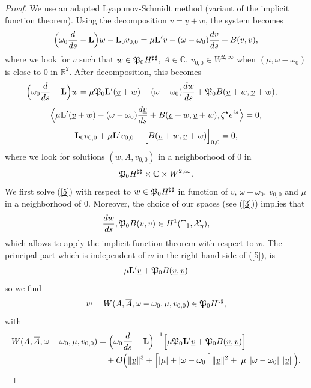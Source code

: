 \documentclass[11pt]{article}
\begin{document}
\begin{proof}
We use an adapted Lyapunov-Schmidt method (variant of the implicit function theorem).
Using the decomposition $v = \underline{v} + w$, the system becomes 
$$
\Bigl( \omega_0 {d \over ds} - {\bf L} \Bigr) w - {\bf L}_{0} v_{0,0}
= \mu {\bf L}' v - (\omega - \omega_0) {dv \over ds} + B(v,v),
$$
where we look for $v$ such that $w \in \frak{P}_0 H^{\sharp\sharp}$, $A \in \mathbb{C}$,
$v_{0,0} \in W^{2,\infty}$
when $(\mu, \omega - \omega_0)$ is close to $0$
in $\mathbb{R}^2$. After decomposition, this becomes
\begin{align} \label{5}
\Bigl( \omega_0 {d \over ds} - {\bf L} \Bigr) w
&= \mu \frak{P}_0 {\bf L}'(\underline{v} + w) 
- (\omega - \omega_0) {d w \over ds} 
+ \frak{P}_0 B(\underline{v} + w, \underline{v} + w),
\end{align}
\begin{equation} \label{6}
\Big\langle \mu {\bf L}'(\underline{v} + w) - (\omega - \omega_0)
{d \underline{v} \over ds} 
+ B(\underline{v} + w, \underline{v} + w) , \zeta^\star e^{i s} \Big\rangle
= 0,
\end{equation}
\begin{equation} \label{7}
{\bf L}_{0} v_{0,0} + \mu {\bf L}' v_{0,0} 
+ \Big[ B(\underline{v} + w, \underline{v} + w ) \Bigr]_{0,0}
= 0,
\end{equation}
where we look for solutions $(w,A,v_{0,0})$ in a neighborhood of $0$
in
$$
\frak{P}_0 H^{\sharp\sharp} \times \mathbb{C} \times W^{2,\infty} .
$$
We first solve (\ref{5}) with respect to $w \in \frak{P}_0 H^{\sharp\sharp}$ in function of 
$\underline{v}$, $\omega - \omega_0$, $v_{0,0}$ and $\mu$ in a neighborhood of $0$.
Moreover, the choice of our spaces (see (\ref{3})) implies that 
$$
{dw \over ds}, \frak{P}_0 B(v,v) \in
H^1(  \mathbb{T}_1 ,{\cal X}_\eta),
$$
which allows to apply the implicit function theorem with respect to $w$. 
The principal part which is independent of $w$ in the right hand side of (\ref{5}), is
$$
\mu {\bf L}' \underline{v} + \frak{P}_0 B(\underline{v},\underline{v})
$$
so we find
$$
w = W(A,\overline{A}, \omega - \omega_0, \mu, v_{0,0}) \in \frak{P}_0 H^{\sharp\sharp},
$$
with
\begin{align*}
W(A,\overline{A}, \omega - \omega_0, \mu, v_{0,0})  &= \Bigl( \omega_0
{d \over ds} - {\bf L} \Bigr)^{-1} 
\Bigl[\mu \frak{P}_0{\bf L}' \underline{v} + \frak{P}_0 B(\underline{v},\underline{v}) \Bigr]
\\
& \quad + O \Bigl(
\| \underline{v} \|^3 + \Bigl[ |\mu| + |\omega - \omega_0 | \Bigr]
\| \underline{v} \|^2 + |\mu| \, | \omega - \omega_0 | \, \| \underline{v} \| \Bigr).

\end{align*}
\end{proof}
\end{document}
